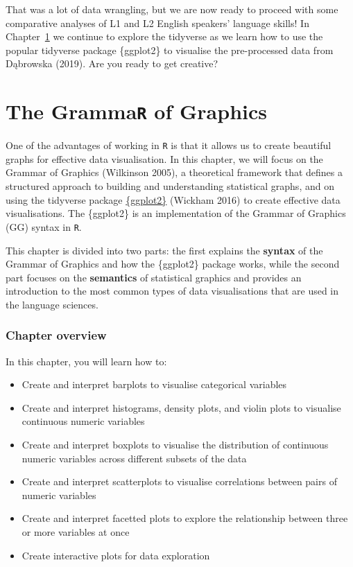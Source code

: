 \documentclass[
  letterpaper,
  DIV=11,
  numbers=noendperiod]{scrreprt}
\providecommand{\tightlist}{%
  \setlength{\itemsep}{0pt}\setlength{\parskip}{0pt}}
\begin{document}
That was a lot of data wrangling, but we are now ready to proceed with
some comparative analyses of L1 and L2 English speakers' language
skills! In Chapter~\ref{sec-DataViz} we continue to explore the
tidyverse as we learn how to use the popular tidyverse package
\{ggplot2\} to visualise the pre-processed data from Dąbrowska (2019).
Are you ready to get creative? 


\chapter{\texorpdfstring{The Gramma\texttt{R} of
Graphics}{The GrammaR of Graphics}}\label{sec-DataViz}

One of the advantages of working in \texttt{R} is that it allows us to
create beautiful graphs for effective data visualisation. In this
chapter, we will focus on the Grammar of Graphics (Wilkinson 2005), a
theoretical framework that defines a structured approach to building and
understanding statistical graphs, and on using the tidyverse package
\href{https://ggplot2.tidyverse.org/}{\{ggplot2\}} (Wickham 2016) to
create effective data visualisations. The \{ggplot2\} is an
implementation of the Grammar of Graphics (GG) syntax in \texttt{R}.

This chapter is divided into two parts: the first explains the
\textbf{syntax} of the Grammar of Graphics and how the \{ggplot2\}
package works, while the second part focuses on the \textbf{semantics}
of statistical graphics and provides an introduction to the most common
types of data visualisations that are used in the language sciences.

\subsection*{Chapter overview}\label{chapter-overview-9}

In this chapter, you will learn how to:

\begin{itemize}
\tightlist
\item
  Create and interpret barplots to visualise categorical variables
\item
  Create and interpret histograms, density plots, and violin plots to
  visualise continuous numeric variables
\item
  Create and interpret boxplots to visualise the distribution of
  continuous numeric variables across different subsets of the data
\item
  Create and interpret scatterplots to visualise correlations between
  pairs of numeric variables
\item
  Create and interpret facetted plots to explore the relationship
  between three or more variables at once
\item
  Create interactive plots for data exploration
\end{itemize}
\end{document}
